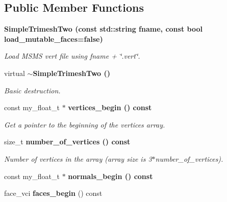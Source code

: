\subsection*{Public Member Functions}
\begin{CompactItemize}
\item 
\bf{Simple\-Trimesh\-Two} (const std::string fname, const bool load\_\-mutable\_\-faces=false)\label{classSimSite3D_1_1geometry_1_1SimpleTrimeshTwo_b97e238865058c9209bb15c60535d08f}

\begin{CompactList}\small\item\em Load MSMS vert file using fname + \char`\"{}.vert\char`\"{}. \item\end{CompactList}\item 
virtual \bf{$\sim$Simple\-Trimesh\-Two} ()\label{classSimSite3D_1_1geometry_1_1SimpleTrimeshTwo_55ef71beb5a8ecd64e57dca7f11e5d27}

\begin{CompactList}\small\item\em Basic destruction. \item\end{CompactList}\item 
const my\_\-float\_\-t $\ast$ \bf{vertices\_\-begin} () const \label{classSimSite3D_1_1geometry_1_1SimpleTrimeshTwo_78f4469ff88513c39e96132017c319e6}

\begin{CompactList}\small\item\em Get a pointer to the beginning of the vertices array. \item\end{CompactList}\item 
size\_\-t \bf{number\_\-of\_\-vertices} () const \label{classSimSite3D_1_1geometry_1_1SimpleTrimeshTwo_8c0fc77ff8dd00a812bb4fdc2358c95c}

\begin{CompactList}\small\item\em Number of vertices in the array (array size is 3$\ast$number\_\-of\_\-vertices). \item\end{CompactList}\item 
const my\_\-float\_\-t $\ast$ \bf{normals\_\-begin} () const 
\item 
face\_\-vci \textbf{faces\_\-begin} () const \label{classSimSite3D_1_1geometry_1_1SimpleTrimeshTwo_214a85d1202d05e1f104322fe9e2496f}


\end{CompactItemize}
